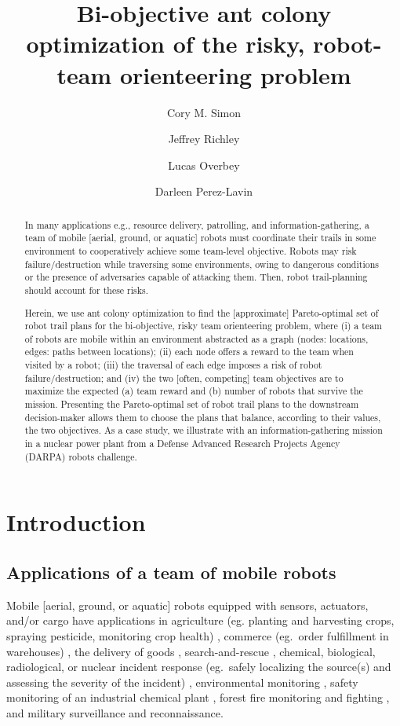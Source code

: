 \documentclass[11pt, oneside]{article}
\title{Bi-objective ant colony optimization of the risky, robot-team orienteering problem}
\author[1]{Cory M. Simon}
\author[2]{Jeffrey Richley}
\author[2]{Lucas Overbey}
\author[2]{Darleen Perez-Lavin}
\affil[1]{School of Chemical, Biological, and Environmental Engineering. Oregon State University. Corvallis, OR. USA.}
\affil[2]{Naval Information Warfare Center Atlantic. Charleston, SC. USA.}
\begin{document}
\maketitle

\begin{abstract}
In many applications e.g., resource delivery, patrolling, and information-gathering, a team of mobile [aerial, ground, or aquatic] robots must coordinate their trails in some environment to cooperatively achieve some team-level objective. Robots may risk failure/destruction while traversing some environments, owing to dangerous conditions or the presence of adversaries capable of attacking them. Then, robot trail-planning should account for these risks.

Herein, we use ant colony optimization to find the [approximate] Pareto-optimal set of robot trail plans for the bi-objective, risky team orienteering problem, where (i) a team of robots are mobile within an environment abstracted as a graph (nodes: locations, edges: paths between locations); (ii) each node offers a reward to the team when visited by a robot; (iii) the traversal of each edge imposes a risk of robot failure/destruction; and (iv) the two [often, competing] team objectives are to maximize the expected (a) team reward and (b) number of robots that survive the mission. 
Presenting the Pareto-optimal set of robot trail plans to the downstream decision-maker allows them to choose the plans that balance, according to their values, the two objectives. As a case study, we illustrate with an information-gathering mission in a nuclear power plant from a Defense Advanced Research Projects Agency (DARPA) robots challenge.
\end{abstract}

\clearpage


\section{Introduction}
\subsection{Applications of a team of mobile robots}
Mobile [aerial, ground, or aquatic] robots equipped with sensors, actuators, and/or cargo have applications in agriculture (eg. planting and harvesting crops, spraying pesticide, monitoring crop health) \cite{santos2020path}, commerce (eg.\ order fulfillment in warehouses) \cite{wurman2008coordinating}, the delivery of goods \cite{coelho2014thirty}, search-and-rescue \cite{queralta2020collaborative}, chemical, biological, radiological, or nuclear incident response (eg.\ safely localizing the source(s) and assessing the severity of the incident) \cite{murphy2012projected}, environmental monitoring \cite{dunbabin2012robots}, safety monitoring of an industrial chemical plant  \cite{soldan2014towards}, forest fire monitoring and fighting \cite{merino2012unmanned}, and military surveillance and reconnaissance. 
\end{document}
